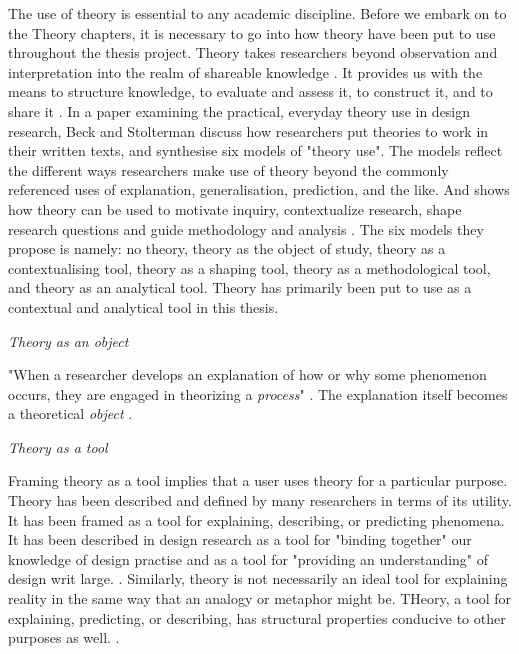The use of theory is essential to any academic discipline. Before we embark on to the Theory chapters, it is necessary to go into how theory have been put to use throughout the thesis project. Theory takes researchers beyond observation and interpretation into the realm of shareable knowledge \autocite[p. 126]{beck_examining_2016}. It provides us with the means to structure knowledge, to evaluate and assess it, to construct it, and to share it \autocite[p. 126]{beck_examining_2016}. In a paper examining the practical, everyday theory use in design research, Beck and Stolterman discuss how researchers put theories to work in their written texts, and synthesise six models of "theory use". The models reflect the different ways researchers make use of theory beyond the commonly referenced uses of explanation, generalisation, prediction, and the like. And shows how theory can be used to motivate inquiry, contextualize research, shape research questions and guide methodology and analysis \autocite[p. 134]{beck_examining_2016}. The six models they propose is namely: no theory, theory as the object of study, theory as a contextualising tool, theory as a shaping tool, theory as a methodological tool, and theory as an analytical tool. Theory has primarily been put to use as a contextual and analytical tool in this thesis. 


\par \emph{Theory as an object} \par
"When a researcher develops an explanation of how or why some phenomenon occurs, they are engaged in theorizing a \emph{process}" \autocite[p.126]{beck_examining_2016}. The explanation itself becomes a theoretical \emph{object} \autocite[p. 126]{beck_examining_2016}.  


\par \emph{Theory as a tool} \par
Framing theory as a tool implies that a user uses theory for a particular purpose. Theory has been described and defined by many researchers in terms of its utility. It has been framed as a tool for explaining, describing, or predicting phenomena. It has been described in design research as a tool for "binding together" our knowledge of design practise and as a tool for "providing an understanding" of design writ large. \autocite[p. 127]{beck_examining_2016}. Similarly, theory is not necessarily an ideal tool for explaining reality in the same way that an analogy or metaphor might be. THeory, a tool for explaining, predicting, or describing, has structural properties conducive to other purposes as well. \autocite[p. 127]{beck_examining_2016}.


